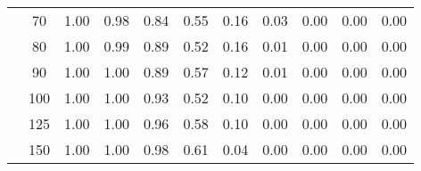 \begin{table}[t]
\begin{center}
\begin{subtable}[c]{\textwidth}
\begin{center}
\begin{tabular}{rcccccccccc}
                                        & \multicolumn{1}{c|}{70}  & \num{1.00}  & \num{0.98}  & \num{0.84}  & \num{0.55}  & \num{0.16}  & \num{0.03}  & \num{0.00}  & \num{0.00}  & \num{0.00}  \\
                                        & \multicolumn{1}{c|}{80}  & \num{1.00}  & \num{0.99}  & \num{0.89}  & \num{0.52}  & \num{0.16}  & \num{0.01}  & \num{0.00}  & \num{0.00}  & \num{0.00}  \\
                                        & \multicolumn{1}{c|}{90}  & \num{1.00}  & \num{1.00}  & \num{0.89}  & \num{0.57}  & \num{0.12}  & \num{0.01}  & \num{0.00}  & \num{0.00}  & \num{0.00}  \\
                                        & \multicolumn{1}{c|}{100}  & \num{1.00}  & \num{1.00}  & \num{0.93}  & \num{0.52}  & \num{0.10}  & \num{0.00}  & \num{0.00}  & \num{0.00}  & \num{0.00}  \\
                                        & \multicolumn{1}{c|}{125}  & \num{1.00}  & \num{1.00}  & \num{0.96}  & \num{0.58}  & \num{0.10}  & \num{0.00}  & \num{0.00}  & \num{0.00}  & \num{0.00}  \\
                                        & \multicolumn{1}{c|}{150}  & \num{1.00}  & \num{1.00}  & \num{0.98}  & \num{0.61}  & \num{0.04}  & \num{0.00}  & \num{0.00}  & \num{0.00}  & \num{0.00}  \\
                                    \end{tabular}
            \end{center}
        \end{subtable}

        \vspace{5mm}


\end{center}
\end{table}
